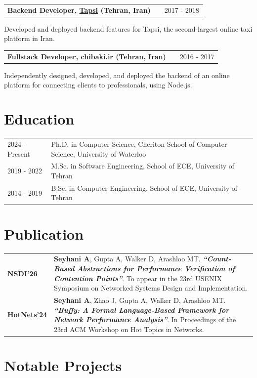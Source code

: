 \documentclass[a4paper,12pt]{article}
\makeatletter
\newcommand{\quotes}[1]{\textit{``#1''}}
\newenvironment{jobshort}[2]
{
    \begin{tabularx}{\linewidth}{@{}l X r@{}}
        \textbf{#1} & \hfill &  #2 \\[3.75pt]
    \end{tabularx}
    }
    {
}
\makeatother
\begin{document}
    \begin{jobshort}{Backend Developer, \href{https://tapsi.ir/en/}{Tapsi} (Tehran, Iran)}{2017 - 2018}
        Developed and deployed backend features for Tapsi, the second-largest online taxi platform in Iran.
    \end{jobshort}

    \begin{jobshort}{Fullstack Developer, chibaki.ir (Tehran, Iran)}{2016 - 2017}
        Independently designed, developed, and deployed the backend of an online platform for connecting clients to professionals, using Node.js.
    \end{jobshort}

    \section{Education}
    \begin{tabularx}{\linewidth}{@{}l X@{}}
        2024 - Present & Ph.D. in Computer Science, Cheriton School of Computer Science, University of Waterloo  \\
        2019 - 2022 & M.Sc. in Software Engineering, School of ECE, University of Tehran  \\
        2014 - 2019 & B.Sc. in Computer Engineering, School of ECE, University of Tehran  \\
    \end{tabularx}

    \section{Publication}
    \begin{tabularx}{\linewidth}{@{}l X@{}}
        \textbf{NSDI'26} &  {
         \textbf{Seyhani A}, Gupta A, Walker D, Arashloo MT. \textbf{\quotes{Count-Based Abstractions for Performance Verification of Contention Points}}. To appear in the 23rd USENIX Symposium on Networked Systems Design and Implementation.
        }
        \\
        \textbf{HotNets'24} &  {
        \textbf{Seyhani A}, Zhao J, Gupta A, Walker D, Arashloo MT.
        \textbf{\quotes{Buffy: A Formal Language-Based Framework for Network Performance Analysis}}. In Proceedings of the 23rd ACM Workshop on Hot Topics in Networks.
        }
        \\
    \end{tabularx}

    \section{Notable Projects}
\end{document}
